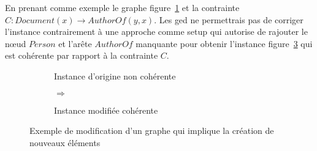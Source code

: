 \begin{example}
      En prenant comme exemple le graphe figure~\ref{fig:update:discussion:g1} et la contrainte $C: Document(x) \to AuthorOf(y, x)$.
      Les \gls{ged} ne permettrais pas de corriger l'instance contrairement à une approche comme \gls{setup} qui autorise de rajouter le nœud $Person$ et l'arête $AuthorOf$ manquante pour obtenir l'instance figure~\ref{fig:update:discussion:g2} qui est cohérente par rapport à la contrainte $C$.

      \begin{figure}[htb]
            \centering
            \begin{subfigure}[c]{.35\textwidth}
                  \centering
                  \caption{Instance d'origine non cohérente}
                  \label{fig:update:discussion:g1}
            \end{subfigure}
            \hfill
            \begin{subfigure}[c]{.1\textwidth}
                \centering
                \huge{$\Longrightarrow$}
            \end{subfigure}
            \hfill
            \begin{subfigure}[c]{.45\textwidth}
                  \centering
                  \caption{Instance modifiée cohérente}
                  \label{fig:update:discussion:g2}
            \end{subfigure}
            \caption[Exemple de modification d'un graphe]{Exemple de modification d'un graphe qui implique la création de nouveaux éléments}
      \end{figure}
\end{example}

